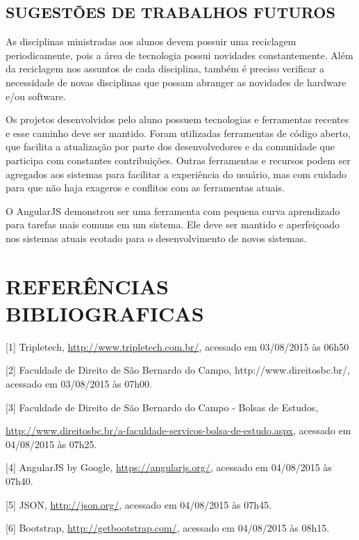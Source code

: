 \documentclass[
  12pt,				%
  openany,
  oneside,
  a4paper,			%
  english,			%
  brazil
]{article}
\numberwithin{figure}{section}
\numberwithin{table}{section}
\begin{document}
\subsection{SUGESTÕES DE TRABALHOS FUTUROS}

As disciplinas ministradas aos alunos devem possuir uma reciclagem periodicamente,
pois a área de tecnologia possui novidades constantemente. Além da reciclagem nos assuntos de cada disciplina, também é preciso verificar a necessidade de novas disciplinas que possam abranger as novidades de hardware e/ou software.

Os projetos desenvolvidos pelo aluno possuem tecnologias e ferramentas recentes e esse caminho deve ser mantido. Foram utilizadas ferramentas de código aberto, que facilita a atualização por parte dos desenvolvedores e da comunidade que participa com constantes contribuições. Outras ferramentas e recursos podem ser agregados aos sistemas para facilitar a experiência do usuário, mas com cuidado para que não haja exageros e conflitos com as ferramentas atuais.

O AngularJS demonstrou ser uma ferramenta com pequena curva aprendizado para tarefas mais comuns em um sistema. Ele deve ser mantido e aperfeiçoado nos sistemas atuais ecotado para o desenvolvimento de novos sistemas.


\clearpage
\section{REFERÊNCIAS BIBLIOGRAFICAS}



[1] Tripletech, \url{http://www.tripletech.com.br/}, acessado em 03/08/2015 às 06h50

[2] Faculdade de Direito de São Bernardo do Campo, http://www.direitosbc.br/, acessado em 03/08/2015 às 07h00.

[3] Faculdade de Direito de São Bernardo do Campo - Bolsas de Estudos,

\url{http://www.direitosbc.br/a-faculdade-servicos-bolsa-de-estudo.aspx}, acessado em 04/08/2015 às 07h25.

[4] AngularJS by Google, \url{https://angularjs.org/}, acessado em 04/08/2015 às 07h40.

[5] JSON, \url{http://json.org/}, acessado em 04/08/2015 às 07h45.

[6] Bootstrap, \url{http://getbootstrap.com/}, acessado em 04/08/2015 às 08h15.
\end{document}
